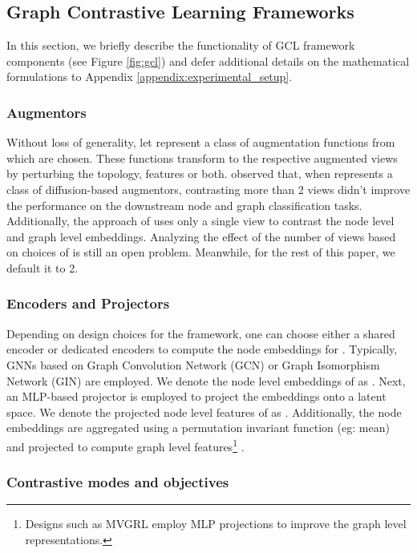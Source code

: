 \documentclass{article}
\theoremstyle{plain}
\theoremstyle{definition}
\theoremstyle{remark}
\begin{document}
\subsection{Graph Contrastive Learning Frameworks}

In this section, we briefly describe the functionality of GCL framework components (see Figure \ref{fig:gcl}) and defer additional details on the mathematical formulations to Appendix \ref{appendix:experimental_setup}.

\subsubsection{Augmentors}

Without loss of generality, let  represent a class of augmentation functions from which  are chosen. These functions transform  to the respective augmented views  by perturbing the topology, features or both. \citet{hassani2020contrastive} observed that, when  represents a class of diffusion-based augmentors, contrasting more than 2 views didn't improve the performance on the downstream node and graph classification tasks. Additionally, the approach of \citet{velickovic2019deep} uses only a single view to contrast the node level and graph level embeddings. Analyzing the effect of the number of views based on choices of  is still an open problem. Meanwhile, for the rest of this paper, we default it to 2.

\subsubsection{Encoders and Projectors}

Depending on design choices for the framework, one can choose either a shared encoder \citep{you2020graph} or dedicated encoders \citep{hassani2020contrastive} to compute the node embeddings for . Typically, GNNs based on Graph Convolution Network (GCN) \citep{kipf2016semi} or Graph Isomorphism Network (GIN) \citep{xu2018powerful} are employed. We denote the node level embeddings of  as . Next, an MLP-based projector is employed to project the embeddings onto a latent space. We denote the projected node level features of  as . Additionally, the node embeddings are aggregated using a permutation invariant function  (eg: mean) and projected to compute graph level features\footnote{Designs such as MVGRL \cite{hassani2020contrastive} employ MLP projections to improve the graph level representations.} . 

\subsubsection{Contrastive modes and objectives}
\end{document}
